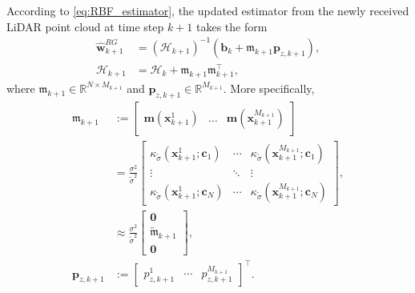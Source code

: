 \documentclass[journal,twoside,web]{ieeecolor}
\newcommand{\mR}{\mathbb{R}}
\begin{document}
According to \eqref{eq:RBF_estimator}, the updated estimator from the newly received LiDAR point cloud at time step $k+1$ takes the form
\begin{subequations}
\begin{align}
\hat{\mathbf{w}}_{k+1}^{RG}
&=(\bm{\mathcal{H}}_{k+1})^{-1}(\mathbf{b}_{k}+\mathfrak{m}_{k+1}\mathbf{p}_{z,k+1}),
\label{eq:weights_update}\\
\bm{\mathcal{H}}_{k+1}&=\bm{\mathcal{H}}_k+\mathfrak{m}_{k+1}\mathfrak{m}_{k+1}^\top,
\label{eq:H_update}
\end{align}
\end{subequations}
where $\mathfrak{m}_{k+1}\in\mR^{N\times M_{k+1}}$ and $\mathbf{p}_{z,k+1}\in\mR^{M_{k+1}}$. More specifically,
\begin{subequations}
\begin{align}
    \mathfrak{m}_{k+1}
    &:=\begin{bmatrix}
        \mathbf{m}(\mathbf{x}_{k+1}^1) & \ldots & \mathbf{m}(\mathbf{x}_{k+1}^{M_{k+1}})
    \end{bmatrix}\nonumber\\
    &=\frac{\sigma^2}{\tilde\sigma^2}\begin{bmatrix}
        \kappa_{\tilde\sigma}(\mathbf{x}_{k+1}^1;\mathbf{c}_1) & \cdots & \kappa_{\tilde\sigma}(\mathbf{x}_{k+1}^{M_{k+1}};\mathbf{c}_1)\\
        \vdots & \ddots & \vdots\\
        \kappa_{\tilde\sigma}(\mathbf{x}_{k+1}^1;\mathbf{c}_N) & \cdots & \kappa_{\tilde\sigma}(\mathbf{x}_{k+1}^{M_{k+1}};\mathbf{c}_N)
    \end{bmatrix},
    \label{eq:rbf_kernel}\\
    &\approx
    \frac{\sigma^2}{\tilde\sigma^2}
    \begin{bmatrix}
        \mathbf{0}\\
        \tilde{\mathfrak{m}}_{k+1}\\
        \mathbf{0}
    \end{bmatrix},
    \label{eq:mfk_m_approx}\\
    \mathbf{p}_{z,k+1}
    &:=
    \begin{bmatrix}
        p_{z,k+1}^1 & \cdots & p_{z,k+1}^{M_{k+1}}
    \end{bmatrix}^\top.
\end{align}
\end{subequations}
\end{document}

